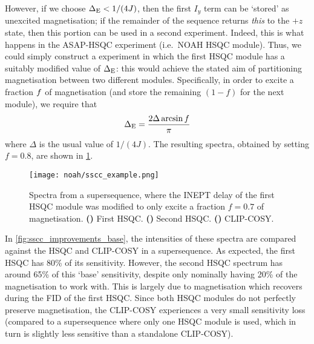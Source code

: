 However, if we choose $\Delta_{\text{E}} < 1/(4J)$, then the first $I_y$ term can be `stored' as unexcited  magnetisation;
if the remainder of the sequence returns \textit{this} to the $+z$ state, then this portion can be used in a second experiment.
Indeed, this is what happens in the ASAP-HSQC experiment (i.e.\ NOAH HSQC module).
Thus, we could simply construct a  experiment in which the first HSQC module has a suitably modified value of $\Delta_{\text{E}}$: this would achieve the stated aim of partitioning  magnetisation between two different modules.
Specifically, in order to excite a fraction $f\/$ of  magnetisation (and store the remaining $(1 - f)$ for the next module), we require that
\begin{equation}
    \label{eq:ssc_inept_delay}
    \Delta_{\text{E}} = \frac{2\Delta \arcsin f}{\pi}
\end{equation}
where $\Delta$ is the usual value of $1/(4J)$.
The resulting spectra, obtained by setting $f = 0.8$, are shown in \cref{fig:sscc_example}.


\begin{figure}[!ht]
    \centering
    \texttt{[image: noah/sscc\_example.png]}%
    {\label{fig:sscc_example_s1}}%
    {\label{fig:sscc_example_s2}}%
    {\label{fig:sscc_example_cc}}%
    \caption[Spectra from  supersequence]{
        Spectra from a  supersequence, where the INEPT delay of the first HSQC module was modified to only excite a fraction $f = 0.7$ of  magnetisation.
        \textbf{()} First HSQC.
        \textbf{()} Second HSQC.
        \textbf{()} CLIP-COSY.
    }
    \label{fig:sscc_example}
\end{figure}

In \cref{fig:sscc_improvements_base}, the intensities of these spectra are compared against the HSQC and CLIP-COSY in a  supersequence.
As expected, the first HSQC has 80\% of its sensitivity.
However, the second HSQC spectrum has around 65\% of this `base' sensitivity, despite only nominally having 20\% of the  magnetisation to work with.
This is largely due to  magnetisation which recovers during the FID of the first HSQC.
Since both HSQC modules do not perfectly preserve  magnetisation, the CLIP-COSY experiences a very small sensitivity loss (compared to a  supersequence where only one HSQC module is used, which in turn is slightly less sensitive than a standalone CLIP-COSY).

